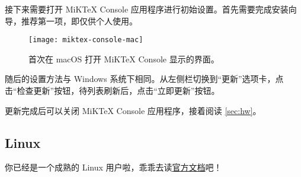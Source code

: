 接下来需要打开 MiKTeX Console 应用程序进行初始设置。首先需要完成安装向导，推荐第一项，即仅供个人使用。

\begin{figure}[htbp]
  \caption{首次在 macOS 打开 MiKTeX Console 显示的界面。}
  \label{fig:miktex-console-mac}
  \texttt{[image: miktex-console-mac]}
\end{figure}

随后的设置方法与 Windows 系统下相同。从左侧栏切换到“更新”选项卡，点击“检查更新”按钮，待列表刷新后，点击“立即更新”按钮。

\begin{widepar}
更新完成后可以关闭 MiKTeX Console 应用程序，接着阅读 \ref{sec:hw}。
\end{widepar}

\subsection{Linux}
\label{subsec:mik-linux}

\begin{widepar}
你已经是一个成熟的 Linux 用户啦，乖乖去读\href{https://miktex.org/howto/install-miktex-unx}{官方文档}吧！
\end{widepar}

